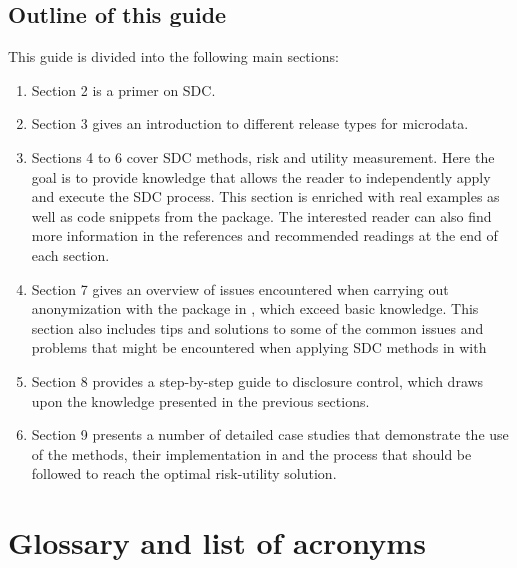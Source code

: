 \documentclass[letterpaper,10pt,english]{sphinxmanual}
\begin{document}
\section{Outline of this guide}
\label{\detokenize{intro:outline-of-this-guide}}
This guide is divided into the following main sections:
\begin{enumerate}
\item {} 
Section 2 is a primer on SDC.

\item {} 
Section 3 gives an introduction to different release types for
microdata.

\item {} 
Sections 4 to 6 cover SDC methods, risk and utility measurement.
Here the goal is to provide knowledge that allows the reader to
independently apply and execute the SDC process. This section is
enriched with real examples as well as code snippets from the
 package. The interested reader can also find more
information in the references and recommended readings at the end
of each section.

\item {} 
Section 7 gives an overview of issues encountered when carrying
out anonymization with the  package in , which exceed
basic  knowledge. This section also includes tips and solutions
to some of the common issues and problems that might be
encountered when applying SDC methods in  with 

\item {} 
Section 8 provides a step-by-step guide to disclosure control,
which draws upon the knowledge presented in the previous sections.

\item {} 
Section 9 presents a number of detailed case studies that
demonstrate the use of the methods, their implementation in
 and the process that should be followed to reach the
optimal risk-utility solution.

\end{enumerate}


\chapter{Glossary and list of acronyms}
\label{\detokenize{glossary_acr:glossary-and-list-of-acronyms}}\label{\detokenize{glossary_acr::doc}}
\end{document}

